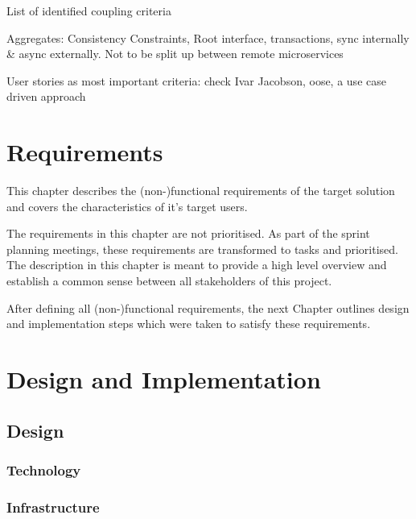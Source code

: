 \documentclass[hsr-ba,english]{hgbthesis}
\begin{document}
List of identified coupling criteria

Aggregates: Consistency Constraints, Root interface, transactions, sync internally \& async externally. Not to be split up between remote microservices

User stories as most important criteria: check Ivar Jacobson, oose, a use case driven approach



\chapter{Requirements}
\label{cha:requirements}

This chapter describes the (non-)functional requirements of the target solution and covers the characteristics of it's target users. 

The requirements in this chapter are not prioritised. As part of the sprint planning meetings, these requirements are transformed to tasks and prioritised. The description in this chapter is meant to provide a high level overview and establish a common sense between all stakeholders of this project.






\bigskip

After defining all (non-)functional requirements, the next Chapter outlines design and implementation steps which were taken to satisfy these requirements.


\chapter{Design and Implementation}
\label{cha:implementation}


\section{Design} 


\subsection{Technology}


\subsection{Infrastructure}
\end{document}
